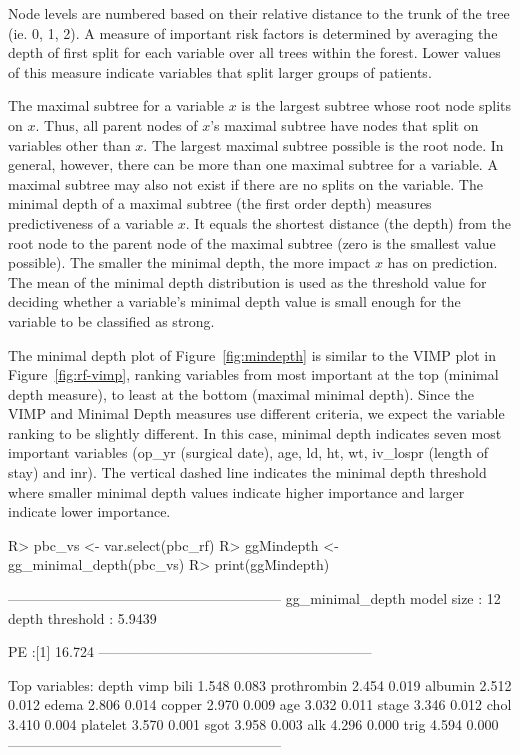 \documentclass[nojss]{jss}\usepackage[]{graphicx}\usepackage[]{color}
\begin{document}
Node levels are numbered based on their relative distance to the trunk of the tree (ie. 0, 1, 2). A measure of important risk factors is determined by averaging the depth of first split for each variable over all trees within the forest. Lower values of this measure indicate variables that split larger groups of patients. 

The maximal subtree for a variable $x$ is the largest subtree whose root node splits on $x$. Thus, all parent nodes of $x$'s maximal subtree have nodes that split on variables other than $x$. The largest maximal subtree possible is the root node. In general, however, there can be more than one maximal subtree for a variable. A maximal subtree may also not exist if there are no splits on the variable. The minimal depth of a maximal subtree (the first order depth) measures predictiveness of a variable $x$. It equals the shortest distance (the depth) from the root node to the parent node of the maximal subtree (zero is the smallest value possible). The smaller the minimal depth, the more impact $x$ has on prediction. The mean of the minimal depth distribution is used as the threshold value for deciding whether a variable's minimal depth value is small enough for the variable to be classified as strong. 

The minimal depth plot of Figure~\ref{fig:mindepth} is similar to the VIMP plot in Figure~\ref{fig:rf-vimp}, ranking variables from most important at the top (minimal depth measure), to least at the bottom (maximal minimal depth). Since the VIMP and Minimal Depth measures use different criteria, we expect the variable ranking to be slightly different. In this case, minimal depth indicates seven most important variables (op\_yr (surgical date), age, ld, ht, wt, iv\_lospr (length of stay) and inr). The vertical dashed line indicates the minimal depth threshold where smaller minimal depth values indicate higher importance and larger indicate lower importance.


\begin{Schunk}
\begin{Sinput}
R> pbc_vs <- var.select(pbc_rf)
R> ggMindepth <- gg_minimal_depth(pbc_vs)
R> print(ggMindepth)
\end{Sinput}
\end{Schunk}

\begin{Schunk}
\begin{Soutput}
-----------------------------------------------------------
gg_minimal_depth
model size         : 12 
depth threshold    : 5.9439 

PE :[1] 16.724
-----------------------------------------------------------

Top variables:
            depth  vimp
bili        1.548 0.083
prothrombin 2.454 0.019
albumin     2.512 0.012
edema       2.806 0.014
copper      2.970 0.009
age         3.032 0.011
stage       3.346 0.012
chol        3.410 0.004
platelet    3.570 0.001
sgot        3.958 0.003
alk         4.296 0.000
trig        4.594 0.000
-----------------------------------------------------------
\end{Soutput}
\end{Schunk}
\end{document}
